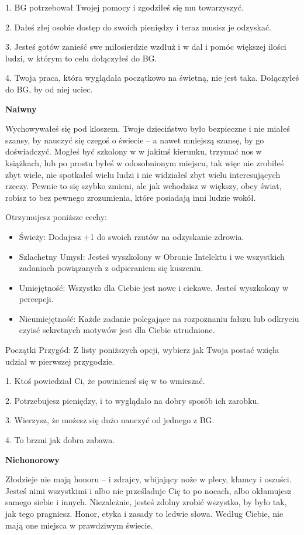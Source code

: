 1. BG potrzebował Twojej pomocy i zgodziłeś się mu towarzyszyć.

2. Dałeś złej osobie dostęp do swoich pieniędzy i teraz musisz je odzyskać.

3. Jesteś gotów zanieść swe miłosierdzie wzdłuż i w dal i pomóc większej ilości ludzi, w którym to celu dołączyłeś do BG.

4. Twoja praca, która wyglądała początkowo na świetną, nie jest taka. Dołączyłeś do BG, by od niej uciec.

\textbf{Naiwny}

Wychowywałeś się pod kloszem. Twoje dzieciństwo było bezpieczne i nie miałeś szansy, by nauczyć się czegoś o świecie – a nawet mniejszą szansę, by go doświadczyć. Mogłeś być szkolony w w jakimś kierunku, trzymać nos w książkach, lub po prostu byłeś w odosobnionym miejscu, tak więc nie zrobiłeś zbyt wiele, nie spotkałeś wielu ludzi i nie widziałeś zbyt wielu interesujących rzeczy. Pewnie to się szybko zmieni, ale jak wchodzisz w większy, obcy świat, robisz to bez pewnego zrozumienia, które posiadają inni ludzie wokół. 

Otrzymujesz poniższe cechy:
\begin{itemize}
\item Świeży: Dodajesz +1 do swoich rzutów na odzyskanie zdrowia.
\item Szlachetny Umysł: Jesteś wyszkolony w Obronie Intelektu i we wszystkich zadaniach powiązanych z odpieraniem się kuszeniu.
\item Umiejętność: Wszystko dla Ciebie jest nowe i ciekawe. Jesteś wyszkolony w percepcji.
\item Nieumiejętność: Każde zadanie polegające na rozpoznaniu fałszu lub odkryciu czyisć sekretnych motywów jest dla Ciebie utrudnione.
\end{itemize}   
    
Początki Przygód: Z listy poniższych opcji, wybierz jak Twoja postać wzięła udział w pierwszej przygodzie.

1. Ktoś powiedział Ci, że powinieneś się w to wmieszać.

2. Potrzebujesz pieniędzy, i to wyglądało na dobry sposób ich zarobku.

3. Wierzysz, że możesz się dużo nauczyć od jednego z BG.

4. To brzmi jak dobra zabawa.

\textbf{Niehonorowy}

Złodzieje nie mają honoru – i zdrajcy, wbijający noże w plecy, kłamcy i oszuści. Jesteś nimi wszystkimi i albo nie prześladuje Cię to po nocach, albo okłamujesz samego siebie i innych. Niezależnie, jesteś zdolny zrobić wszystko, by było tak, jak tego pragniesz. Honor, etyka i zasady to ledwie słowa. Według Ciebie, nie mają one miejsca w prawdziwym świecie.

